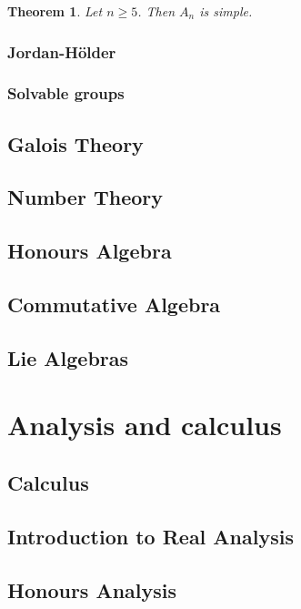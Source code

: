 \documentclass[12pt]{report}
\newtheorem{theorem}{Theorem}[section] %
\theoremstyle{definition}
\begin{document}
\begin{theorem}
  Let \(n \geq 5\). Then \(A_{n}\) is simple.
\end{theorem}


\section{Jordan-H\"older}
\section{Solvable groups}


\chapter{Galois Theory}\label{cha:galois-theory}

\chapter{Number Theory}\label{cha:intr-numb-theory}

\chapter{Honours Algebra}\label{cha:honours-algebra}

\chapter{Commutative Algebra}\label{cha:commutative-algebra}

\chapter{Lie Algebras}\label{cha:lie-algebras} \part{Analysis and calculus} \chapter{Calculus}\label{cha:calculus}
\chapter{Introduction to Real Analysis}\label{cha:intr-real-analys}

\chapter{Honours Analysis}\label{cha:honours-analysis}
\end{document}
